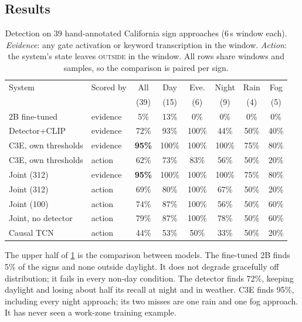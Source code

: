 \documentclass[journal]{IEEEtran}
\newcommand{\st}[1]{\textsc{#1}}
\begin{document}
\subsection{Results}

\begin{table}[t]
\centering
\caption{Detection on 39 hand-annotated California sign approaches (6\,s window each).  \emph{Evidence}: any gate activation or keyword transcription in the window.  \emph{Action}: the system's state leaves \st{outside} in the window. All rows share windows and samples, so the comparison is paired per sign.}
\label{tab:ood}
\footnotesize
\setlength{\tabcolsep}{3pt}
\begin{tabular}{@{}llcccccc@{}}
\toprule
System & Scored by & All & Day & Eve. & Night & Rain & Fog \\
& & (39) & (15) & (6) & (9) & (4) & (5) \\
\midrule
2B fine-tuned        & evidence & 5\%  & 13\% & 0\% & 0\% & 0\% & 0\% \\
Detector+CLIP        & evidence & 72\% & 93\% & 100\% & 44\% & 50\% & 40\% \\
C3E, own thresholds  & evidence & \textbf{95\%} & 100\% & 100\% & 100\% & 75\% & 80\% \\
\midrule
C3E, own thresholds  & action   & 62\% & 73\% & 83\% & 56\% & 50\% & 20\% \\
Joint (312)          & evidence & \textbf{95\%} & 100\% & 100\% & 100\% & 75\% & 80\% \\
Joint (312)          & action   & 69\% & 80\% & 100\% & 67\% & 50\% & 20\% \\
Joint (100)          & action   & 74\% & 87\% & 100\% & 56\% & 50\% & 60\% \\
Joint, no detector   & action   & 79\% & 87\% & 100\% & 78\% & 50\% & 60\% \\
Causal TCN           & action   & 44\% & 53\% & 50\% & 33\% & 50\% & 20\% \\
\bottomrule
\end{tabular}
\end{table}

The upper half of \cref{tab:ood} is the comparison between models.  The fine-tuned 2B finds 5\% of the signs and none outside daylight.  It does not degrade gracefully off distribution; it fails in every non-day condition.  The detector finds 72\%, keeping daylight and losing about half its recall at night and in weather.  C3E finds 95\%, including every night approach; its two misses are one rain and one fog approach.  It has never seen a work-zone training example.
\end{document}
